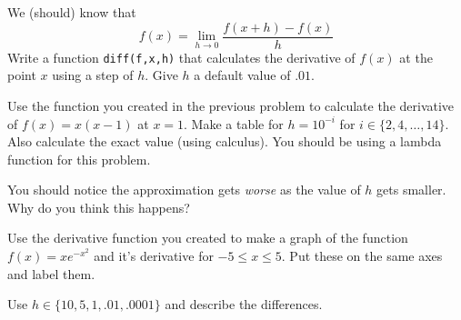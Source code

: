 \documentclass[11pt,letterpaper]{article}
\begin{document}
\begin{problem}
We (should) know that
\[
f(x) = \lim_{h\rightarrow 0}\frac{f(x+h)-f(x)}{h}
\]
Write a function \texttt{diff(f,x,h)} that calculates the derivative of $f(x)$ at the point $x$
using a step of $h$. Give $h$ a default value of $.01$.

\end{problem}

\begin{problem}
Use the function you created in the previous problem to calculate the derivative of 
$f(x)=x(x-1)$ at $x=1$. Make a table for $h=10^{-i}$ for $i\in\{2,4,\dots,14\}$. Also calculate 
the exact value (using calculus). You should be using a lambda function for this problem.

You should notice the approximation gets \emph{worse} as the value of $h$ gets smaller. Why do
you think this happens?
\end{problem}


\begin{problem}
Use the derivative function you created to make a graph of the function $f(x)=xe^{-x^2}$ and it's
derivative for $-5\le x\le 5$. Put these on the same axes and label them. 

Use $h\in\{10,5,1,.01,.0001\}$ and describe the differences.
\end{problem}
\end{document}
